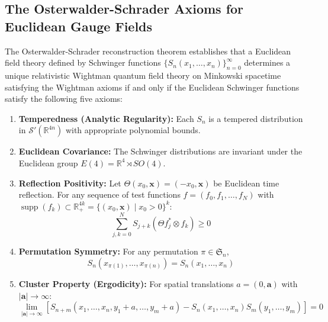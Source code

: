 \documentclass[11pt,a4paper]{article}
\theoremstyle{definition}
\begin{document}
\subsection{The Osterwalder-Schrader Axioms for Euclidean Gauge Fields}
The Osterwalder-Schrader reconstruction theorem establishes that a Euclidean field theory defined by Schwinger functions $\{S_n(x_1, \dots, x_n)\}_{n=0}^\infty$ determines a unique relativistic Wightman quantum field theory on Minkowski spacetime satisfying the Wightman axioms if and only if the Euclidean Schwinger functions satisfy the following five axioms:
\begin{enumerate}
    \item[\textbf{(OS0)}] \textbf{Temperedness (Analytic Regularity):} Each $S_n$ is a tempered distribution in $\mathcal{S}'(\mathbb{R}^{4n})$ with appropriate polynomial bounds.
    \item[\textbf{(OS1)}] \textbf{Euclidean Covariance:} The Schwinger distributions are invariant under the Euclidean group $E(4) = \mathbb{R}^4 \rtimes SO(4)$.
    \item[\textbf{(OS2)}] \textbf{Reflection Positivity:} Let $\Theta(x_0, \mathbf{x}) = (-x_0, \mathbf{x})$ be Euclidean time reflection. For any sequence of test functions $f = (f_0, f_1, \dots, f_N)$ with $\operatorname{supp}(f_k) \subset \mathbb{R}_+^{4k} = \{ (x_0, \mathbf{x}) \mid x_0 > 0 \}^k$:
    \begin{equation}
    \sum_{j,k=0}^N S_{j+k}(\Theta f_j^* \otimes f_k) \ge 0
    \end{equation}
    \item[\textbf{(OS3)}] \textbf{Permutation Symmetry:} For any permutation $\pi \in \mathfrak{S}_n$,
    \begin{equation}
    S_n(x_{\pi(1)}, \dots, x_{\pi(n)}) = S_n(x_1, \dots, x_n)
    \end{equation}
    \item[\textbf{(OS4)}] \textbf{Cluster Property (Ergodicity):} For spatial translations $a = (0, \mathbf{a})$ with $|\mathbf{a}| \to \infty$:
    \begin{equation}
    \lim_{|\mathbf{a}| \to \infty} \left[ S_{n+m}(x_1, \dots, x_n, y_1+a, \dots, y_m+a) - S_n(x_1,\dots,x_n) S_m(y_1,\dots,y_m) \right] = 0
    \end{equation}
\end{enumerate}
\end{document}
